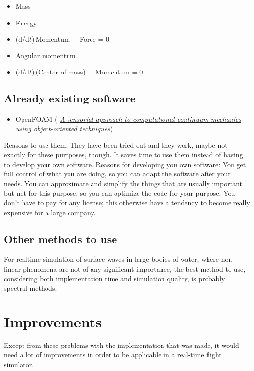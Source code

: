 \begin{itemize}
    \item Mass
    \item Energy
    \item (d/d$t$)\,Momentum $-$ Force = 0
    \item Angular momentum
    \item (d/d$t$)\,(Center of mass) $-$ Momentum = 0
\end{itemize}

\section{Already existing software}

\begin{itemize}
    \item OpenFOAM ( \textit{\href{http://powerlab.fsb.hr/ped/kturbo/openfoam/docs/foam.pdf}{A tensorial approach to computational continuum mechanics using object-oriented techniques}})
\end{itemize}

Reasons to use them: They have been tried out and they work, maybe not exactly for these purtposes, though. It saves time to use them instead of having to develop your own software. Reasons for developing you own software: You get full control of what you are doing, so you can adapt the software after your needs. You can approximate and simplify the things that are usually important but not for this purpose, so you can optimize the code for your purpose. You don't have to pay for any license; this otherwise have a tendency to become really expensive for a large company.

\section{Other methods to use}

For realtime simulation of surface waves in large bodies of water, where non-linear phenomena are not of any significant importance, the best method to use, considering both implementation time and simulation quality, is probably spectral methods.

\chapter{Improvements}

Except from these problems with the implementation that was made, it would need a lot of improvements in order to be applicable in a real-time flight simulator.

